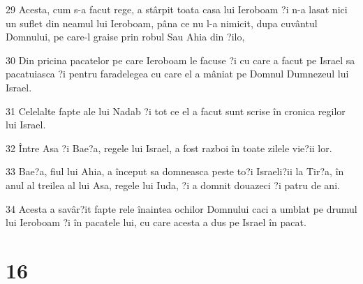 \par 29 Acesta, cum s-a facut rege, a stârpit toata casa lui Ieroboam ?i n-a lasat nici un suflet din neamul lui Ieroboam, pâna ce nu l-a nimicit, dupa cuvântul Domnului, pe care-l graise prin robul Sau Ahia din ?ilo,
\par 30 Din pricina pacatelor pe care Ieroboam le facuse ?i cu care a facut pe Israel sa pacatuiasca ?i pentru faradelegea cu care el a mâniat pe Domnul Dumnezeul lui Israel.
\par 31 Celelalte fapte ale lui Nadab ?i tot ce el a facut sunt scrise în cronica regilor lui Israel.
\par 32 Între Asa ?i Bae?a, regele lui Israel, a fost razboi în toate zilele vie?ii lor.
\par 33 Bae?a, fiul lui Ahia, a început sa domneasca peste to?i Israeli?ii la Tir?a, în anul al treilea al lui Asa, regele lui Iuda, ?i a domnit douazeci ?i patru de ani.
\par 34 Acesta a savâr?it fapte rele înaintea ochilor Domnului caci a umblat pe drumul lui Ieroboam ?i în pacatele lui, cu care acesta a dus pe Israel în pacat.

\chapter{16}

